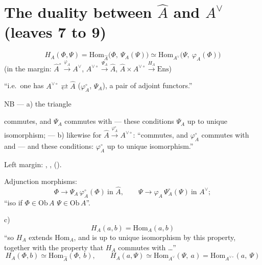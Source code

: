 \documentclass[11pt,a4paper]{article}
\begin{document}
\section*{The duality between $\widehat{A}$ and $A^{\vee}$ (leaves 7 to 9)}

\[
\boxed{\ H_{A}(\Phi,\Psi)
= \mathrm{Hom}_{\widehat{A}}\bigl(\Phi,\ \Psi_{A}(\Psi)\bigr)
\simeq \mathrm{Hom}_{A^{\vee}}\bigl(\Psi,\ \varphi_{A}(\Phi)\bigr)\ }
\]
(in the margin: $\widehat{A}^{\circ} \xrightarrow{\varphi_{A}} A^{\vee}$,
$A^{\vee\circ} \xrightarrow{\Psi_{A}} \widehat{A}$,
$\widehat{A} \times A^{\vee\circ} \xrightarrow{H_{A}} \mathrm{Ens}$)

``i.e.\ one has $A^{\vee\circ} \rightleftarrows \widehat{A}$
($\varphi_{A}^{\circ}$, $\Psi_{A}$), a pair of adjoint functors.''

NB — a) the triangle
commutes, and $\Psi_{A}$ commutes with  — these
 conditions  $\Psi_{A}$ up to unique
isomorphism; — b) likewise for
$\widehat{A} \xrightarrow{\varphi_{A}^{\circ}} A^{\vee\circ}$:
``commutes, and $\varphi_{A}^{\circ}$ commutes with \ill{} and \ill{} — and
these conditions: $\varphi_{A}^{\circ}$ up to unique isomorphism.''

Left margin: ,
,
().

Adjunction morphisms:
\[
\Phi \longrightarrow \Psi_{A}\,\varphi_{A}^{\circ}(\Phi)
\ \text{in } \widehat{A},
\qquad
\Psi \longrightarrow \varphi_{A}\,\Psi_{A}^{\circ}(\Psi)
\ \text{in } A^{\vee} ;
\]
``iso if $\Phi \in \mathrm{Ob}\,A$  $\Psi \in \mathrm{Ob}\,A$''.

c)
\[
\boxed{\ H_{A}(a,b) = \mathrm{Hom}_{A}(a,b)\ }
\]
``so $H_{A}$ extends $\mathrm{Hom}_{A}$, and is  up to
unique isomorphism by this property, together with the property that
$H_{A}$ commutes with  \ldots''
\[
H_{A}(\Phi, b) \simeq \mathrm{Hom}_{\widehat{A}}(\Phi,\ b),
\qquad
H_{A}(a, \Psi) \simeq \mathrm{Hom}_{A^{\vee}}(\Psi,\ a)
= \mathrm{Hom}_{A^{\vee\circ}}(a,\ \Psi)
\]
\end{document}
